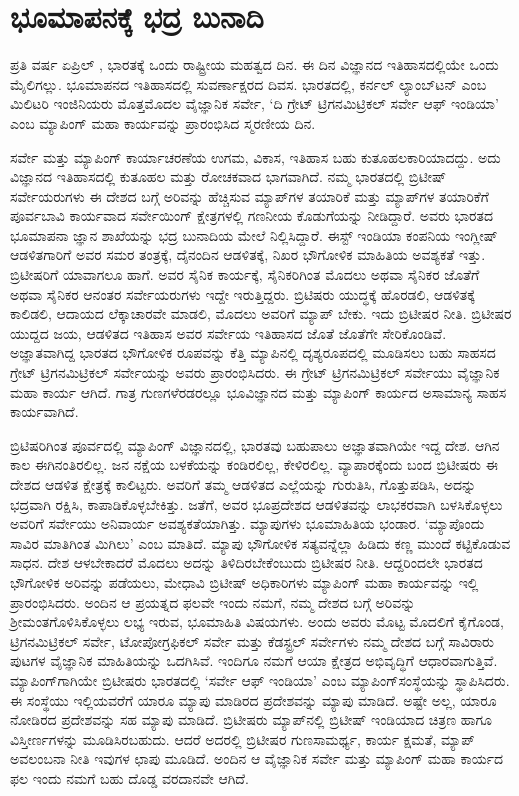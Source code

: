 
\chapter{ಭೂಮಾಪನಕ್ಕೆ ಭದ್ರ ಬುನಾದಿ}

ಪ್ರತಿ ವರ್ಷ ಏಪ್ರಿಲ್ ​, ಭಾರತಕ್ಕೆ ಒಂದು ರಾಷ್ಟ್ರೀಯ ಮಹತ್ವದ ದಿನ. ಈ ದಿನ ವಿಜ್ಞಾನದ ಇತಿಹಾಸದಲ್ಲಿಯೇ ಒಂದು ಮೈಲಿಗಲ್ಲು. ಭೂಮಾಪನದ ಇತಿಹಾಸದಲ್ಲಿ ಸುವರ್ಣಾಕ್ಷರದ ದಿವಸ. ಭಾರತದಲ್ಲಿ, ಕರ್ನಲ್​ ಲ್ಯಾಂಬ್​ಟನ್​ ಎಂಬ ಮಿಲಿಟರಿ ಇಂಜಿನಿಯರು ಮೊತ್ತಮೊದಲ ವೈಜ್ಞಾನಿಕ ಸರ್ವೇ, ‘ದಿ ಗ್ರೇಟ್​ ಟ್ರಿಗನಮಿಟ್ರಿಕಲ್​ ಸರ್ವೇ ಆಫ್​ ಇಂಡಿಯಾ’ ಎಂಬ ಮ್ಯಾಪಿಂಗ್​ ಮಹಾ ಕಾರ್ಯವನ್ನು ಪ್ರಾರಂಭಿಸಿದ ಸ್ಮರಣೀಯ ದಿನ.

ಸರ್ವೇ ಮತ್ತು ಮ್ಯಾಪಿಂಗ್​ ಕಾರ್ಯಾಚರಣೆಯ ಉಗಮ, ವಿಕಾಸ, ಇತಿಹಾಸ ಬಹು ಕುತೂಹಲಕಾರಿಯಾದದ್ದು. ಅದು ವಿಜ್ಞಾನದ ಇತಿಹಾಸದಲ್ಲಿ ಕುತೂಹಲ ಮತ್ತು ರೋಚಕವಾದ ಭಾಗವಾಗಿದೆ. ನಮ್ಮ ಭಾರತದಲ್ಲಿ ಬ್ರಿಟೀಷ್​ ಸರ್ವೇಯರುಗಳು ಈ ದೇಶದ ಬಗ್ಗೆ ಅರಿವನ್ನು ಹೆಚ್ಚಿಸುವ ಮ್ಯಾಪ್​ಗಳ ತಯಾರಿಕೆ ಮತ್ತು ಮ್ಯಾಪ್​ಗಳ ತಯಾರಿಕೆಗೆ ಪೂರ್ವಬಾವಿ ಕಾರ್ಯವಾದ ಸರ್ವೇಯಿಂಗ್​ ಕ್ಷೇತ್ರಗಳಲ್ಲಿ ಗಣನೀಯ ಕೊಡುಗೆಯನ್ನು ನೀಡಿದ್ದಾರೆ. ಅವರು ಭಾರತದ ಭೂಮಾಪನಾ ಜ್ಞಾನ ಶಾಖೆಯನ್ನು ಭದ್ರ ಬುನಾದಿಯ ಮೇಲೆ ನಿಲ್ಲಿಸಿದ್ದಾರೆ. ಈಸ್ಟ್​ ಇಂಡಿಯಾ ಕಂಪನಿಯ ಇಂಗ್ಲೀಷ್​ ಆಡಳಿತಗಾರಿಗೆ ಅವರ ಸಮರ ತಂತ್ರಕ್ಕೆ, ದೈನಂದಿನ ಆಡಳಿತಕ್ಕೆ, ನಿಖರ ಭೌಗೋಳಿಕ ಮಾಹಿತಿಯ ಅವಶ್ಯಕತೆ ಇತ್ತು. ಬ್ರಿಟೀಷರಿಗೆ ಯಾವಾಗಲೂ ಹಾಗೆ. ಅವರ ಸೈನಿಕ ಕಾರ್ಯಕ್ಕೆ, ಸೈನಿಕರಿಗಿಂತ ಮೊದಲು ಅಥವಾ ಸೈನಿಕರ ಜೊತೆಗೆ ಅಥವಾ ಸೈನಿಕರ ಆನಂತರ ಸರ್ವೇಯರುಗಳು ಇದ್ದೇ ಇರುತ್ತಿದ್ದರು. ಬ್ರಿಟಿಷರು ಯುದ್ಧಕ್ಕೆ ಹೊರಡಲಿ, ಆಡಳಿತಕ್ಕೆ ಕಾಲಿಡಲಿ, ಆದಾಯದ ಲೆಕ್ಕಾಚಾರವೇ ಮಾಡಲಿ, ಮೊದಲು ಅವರಿಗೆ ಮ್ಯಾಪ್​ ಬೇಕು. ಇದು ಬ್ರಿಟೀಷರ ನೀತಿ. ಬ್ರಿಟೀಷರ ಯುದ್ದದ ಜಯ, ಆಡಳಿತದ ಇತಿಹಾಸ ಅವರ ಸರ್ವೇಯ ಇತಿಹಾಸದ ಜೊತೆ ಜೊತೆಗೇ ಸೇರಿಕೊಂಡಿವೆ. ಅಜ್ಞಾತವಾಗಿದ್ದ ಭಾರತದ ಭೌಗೋಳಿಕ ರೂಪವನ್ನು ಕೆತ್ತಿ ಮ್ಯಾಪಿನಲ್ಲಿ ದೃಶ್ಯರೂಪದಲ್ಲಿ ಮೂಡಿಸಲು ಬಹು ಸಾಹಸದ ಗ್ರೇಟ್​ ಟ್ರಿಗನಮಿಟ್ರಿಕಲ್​ ಸರ್ವೇಯನ್ನು ಅವರು ಪ್ರಾರಂಭಿಸಿದರು. ಈ ಗ್ರೇಟ್​ ಟ್ರಿಗನಮಿಟ್ರಿಕಲ್​ ಸರ್ವೇಯು ವೈಜ್ಞಾನಿಕ ಮಹಾ ಕಾರ್ಯ ಆಗಿದೆ. ಗಾತ್ರ ಗುಣಗಳೆರಡರಲ್ಲೂ ಭೂವಿಜ್ಞಾನದ ಮತ್ತು ಮ್ಯಾಪಿಂಗ್​ ಕಾರ್ಯದ ಅಸಾಮಾನ್ಯ ಸಾಹಸ ಕಾರ್ಯವಾಗಿದೆ.

ಬ್ರಿಟಿಷರಿಗಿಂತ ಪೂರ್ವದಲ್ಲಿ ಮ್ಯಾಪಿಂಗ್​ ವಿಜ್ಞಾನದಲ್ಲಿ, ಭಾರತವು ಬಹುಪಾಲು ಅಜ್ಞಾತವಾಗಿಯೇ ಇದ್ದ ದೇಶ. ಆಗಿನ ಕಾಲ ಈಗಿನಂತಿರಲಿಲ್ಲ. ಜನ ನಕ್ಷೆಯ ಬಳಕೆಯನ್ನು ಕಂಡಿರಲಿಲ್ಲ, ಕೇಳಿರಲಿಲ್ಲ. ವ್ಯಾಪಾರಕ್ಕೆಂದು ಬಂದ ಬ್ರಿಟೀಷರು ಈ ದೇಶದ ಆಡಳಿತ ಕ್ಷೇತ್ರಕ್ಕೆ ಕಾಲಿಟ್ಟರು. ಅವರಿಗೆ ತಮ್ಮ ಆಡಳಿತದ ಎಲ್ಲೆಯನ್ನು ಗುರುತಿಸಿ, ಗೊತ್ತುಪಡಿಸಿ, ಅದನ್ನು ಭದ್ರವಾಗಿ ರಕ್ಷಿಸಿ, ಕಾಪಾಡಿಕೊಳ್ಳಬೇಕಿತ್ತು. ಜತೆಗೆ, ಅವರ ಭೂಪ್ರದೇಶದ ಆಡಳಿತವನ್ನು ಲಾಭಕರವಾಗಿ ಬಳಸಿಕೊಳ್ಳಲು ಅವರಿಗೆ ಸರ್ವೇಯು ಅನಿವಾರ್ಯ ಅವಶ್ಯಕತೆಯಾಗಿತ್ತು. ಮ್ಯಾಪುಗಳು ಭೂಮಾಹಿತಿಯ ಭಂಡಾರ. ‘ಮ್ಯಾಪೊಂದು ಸಾವಿರ ಮಾತಿಗಿಂತ ಮಿಗಿಲು’ ಎಂಬ ಮಾತಿದೆ. ಮ್ಯಾಪು ಭೌಗೋಳಿಕ ಸತ್ಯವನ್ನೆಲ್ಲಾ ಹಿಡಿದು ಕಣ್ಣ ಮುಂದೆ ಕಟ್ಟಿಕೊಡುವ ಸಾಧನ. ದೇಶ ಆಳಬೇಕಾದರೆ ಮೊದಲು ಅದನ್ನು ತಿಳಿದಿರಬೇಕೆಂಬುದು ಬ್ರಿಟೀಷರ ನೀತಿ. ಆದ್ದರಿಂದಲೇ ಭಾರತದ ಭೌಗೋಳಿಕ ಅರಿವನ್ನು ಪಡೆಯಲು, ಮೇಧಾವಿ ಬ್ರಿಟೀಷ್​ ಅಧಿಕಾರಿಗಳು ಮ್ಯಾಪಿಂಗ್​ ಮಹಾ ಕಾರ್ಯವನ್ನು ಇಲ್ಲಿ ಪ್ರಾರಂಭಿಸಿದರು. ಅಂದಿನ ಆ ಪ್ರಯತ್ನದ ಫಲವೇ ಇಂದು ನಮಗೆ, ನಮ್ಮ ದೇಶದ ಬಗ್ಗೆ ಅರಿವನ್ನು ಶ‍್ರೀಮಂತಗೊಳಿಸಿಕೊಳ್ಳಲು ಲಭ್ಯ ಇರುವ, ಭೂಮಾಹಿತಿ ವಿಷಯಗಳು. ಅಂದು ಅವರು ಮೊಟ್ಟ ಮೊದಲಿಗೆ ಕೈಗೊಂಡ, ಟ್ರಿಗನಮಿಟ್ರಿಕಲ್​ ಸರ್ವೇ, ಟೋಪೋಗ್ರಫಿಕಲ್​ ಸರ್ವೇ ಮತ್ತು ಕೆಡಸ್ಟ್ರಲ್​ ಸರ್ವೇಗಳು ನಮ್ಮ ದೇಶದ ಬಗ್ಗೆ ಸಾವಿರಾರು ಪುಟಗಳ ವೈಜ್ಞಾನಿಕ ಮಾಹಿತಿಯನ್ನು ಒದಗಿಸಿವೆ. ಇಂದಿಗೂ ನಮಗೆ ಆಯಾ ಕ್ಷೇತ್ರದ ಅಭಿವೃದ್ಧಿಗೆ ಆಧಾರವಾಗುತ್ತಿವೆ. ಮ್ಯಾಪಿಂಗ್​ಗಾಗಿಯೇ ಬ್ರಿಟೀಷರು ಭಾರತದಲ್ಲಿ ‘ಸರ್ವೇ ಆಫ್​ ಇಂಡಿಯಾ’ ಎಂಬ ಮ್ಯಾಪಿಂಗ್​ ಸಂಸ್ಥೆಯನ್ನು ಸ್ಥಾಪಿಸಿದರು. ಈ ಸಂಸ್ಥೆಯು ಇಲ್ಲಿಯವರೆಗೆ ಯಾರೂ ಮ್ಯಾಪು ಮಾಡಿರದ ಪ್ರದೇಶವನ್ನು ಮ್ಯಾಪು ಮಾಡಿದೆ. ಅಷ್ಟೇ ಅಲ್ಲ, ಯಾರೂ ನೋಡಿರದ ಪ್ರದೇಶವನ್ನು ಸಹ ಮ್ಯಾಪು ಮಾಡಿದೆ. ಬ್ರಿಟೀಷರು ಮ್ಯಾಪ್​ನಲ್ಲಿ ಬ್ರಿಟೀಷ್​ ಇಂಡಿಯಾದ ಚಿತ್ರಣ ಹಾಗೂ ವಿಸ್ತೀರ್ಣಗಳನ್ನು ಮೂಡಿಸಿರಬಹುದು. ಆದರೆ ಅದರಲ್ಲಿ ಬ್ರಿಟೀಷರ ಗುಣಸಾಮರ್ಥ್ಯ, ಕಾರ್ಯ ಕ್ಷಮತೆ, ಮ್ಯಾಪ್​ ಅವಲಂಬನಾ ನೀತಿ ಇವುಗಳ ಛಾಪು ಮೂಡಿದೆ. ಅಂದಿನ ಆ ವೈಜ್ಞಾನಿಕ ಸರ್ವೇ ಮತ್ತು ಮ್ಯಾಪಿಂಗ್​ ಮಹಾ ಕಾರ್ಯದ ಫಲ ಇಂದು ನಮಗೆ ಬಹು ದೊಡ್ಡ ವರದಾನವೇ ಆಗಿದೆ.

